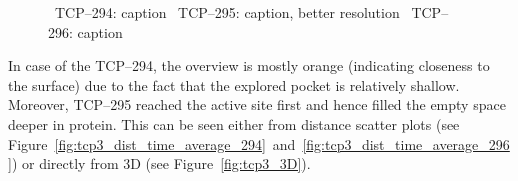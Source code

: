 \documentclass[twocolumn]{bmcart}%
\begin{document}
\begin{figure}[htb]
	\centering
  \caption{
  \label{fig:tcp3_distances}
  ~TCP--294: caption
  ~TCP--295: caption, better resolution
  ~TCP--296: caption
  }
\end{figure} 

In case of the TCP--294, the overview is mostly orange (indicating closeness to the surface) due to the fact that the explored pocket is relatively shallow.
Moreover, TCP--295 reached the active site first and hence filled the empty space deeper in protein.
This can be seen either from distance scatter plots (see Figure~\ref{fig:tcp3_dist_time_average_294}~and~\ref{fig:tcp3_dist_time_average_296}) or directly from 3D (see Figure~\ref{fig:tcp3_3D}).
\end{document}
